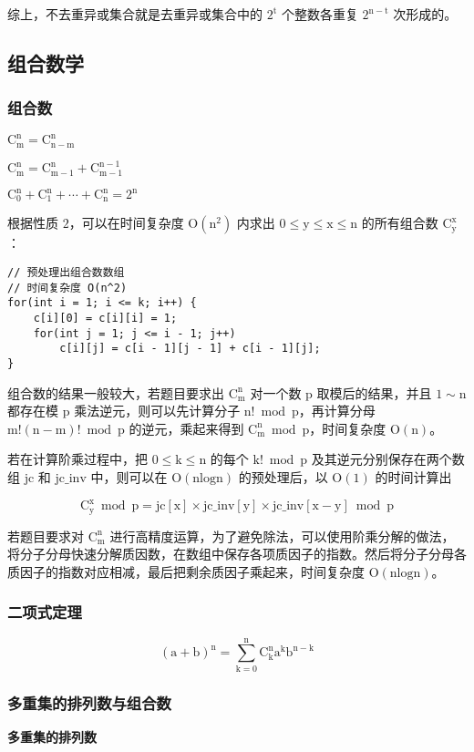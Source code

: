 \documentclass[UTF8]{article}
\begin{document}
综上，不去重异或集合就是去重异或集合中的 $\mathrm{2^t}$ 个整数各重复 $\mathrm{2^{n - t}}$ 次形成的。




\subsection{组合数学}
\subsubsection{组合数}
\noindent $\mathrm{C^n_m = C^n_{n - m}}$

\noindent $\mathrm{C^n_m = C^n_{m - 1} + C^{n - 1}_{m - 1}}$

\noindent $\mathrm{C^n_0 + C^n_1 + \cdots + C^n_n = 2^n}$

根据性质 $\mathrm{2}$，可以在时间复杂度 $\mathrm{O(n^2)}$ 内求出 $\mathrm{0 \le y \le x \le n}$ 的所有组合数 $\mathrm{C^x_y}$：
\begin{lstlisting}[caption=求组合数]
// 预处理出组合数数组
// 时间复杂度 O(n^2)
for(int i = 1; i <= k; i++) {
	c[i][0] = c[i][i] = 1;
	for(int j = 1; j <= i - 1; j++)
		c[i][j] = c[i - 1][j - 1] + c[i - 1][j];
}
\end{lstlisting}

组合数的结果一般较大，若题目要求出 $\mathrm{C^n_m}$ 对一个数 $\mathrm{p}$ 取模后的结果，并且 $\mathrm{1 \sim n}$ 都存在模 $\mathrm{p}$ 乘法逆元，则可以先计算分子 $\mathrm{n! \bmod p}$，再计算分母 $\mathrm{m!(n - m)! \bmod p}$ 的逆元，乘起来得到 $\mathrm{C^n_m \bmod p}$，时间复杂度 $\mathrm{O(n)}$。

若在计算阶乘过程中，把 $\mathrm{0 \le k \le n}$ 的每个 $\mathrm{k! \bmod p}$ 及其逆元分别保存在两个数组 $\mathrm{jc}$ 和 $\mathrm{jc\_inv}$ 中，则可以在 $\mathrm{O(nlogn)}$ 的预处理后，以 $\mathrm{O(1)}$ 的时间计算出 

$$
\mathrm{C^x_y \bmod p = jc[x] \times jc\_inv[y] \times jc\_inv[x-y] \bmod p}
$$

若题目要求对 $\mathrm{C^n_m}$ 进行高精度运算，为了避免除法，可以使用阶乘分解的做法，将分子分母快速分解质因数，在数组中保存各项质因子的指数。然后将分子分母各质因子的指数对应相减，最后把剩余质因子乘起来，时间复杂度 $\mathrm{O(nlogn)}$。


\subsubsection{二项式定理}
$$
\mathrm{(a+b)^n = \sum^n_{k = 0}C^n_ka^kb^{n - k}}
$$


\subsubsection{多重集的排列数与组合数}
\textbf{多重集的排列数}
\end{document}
